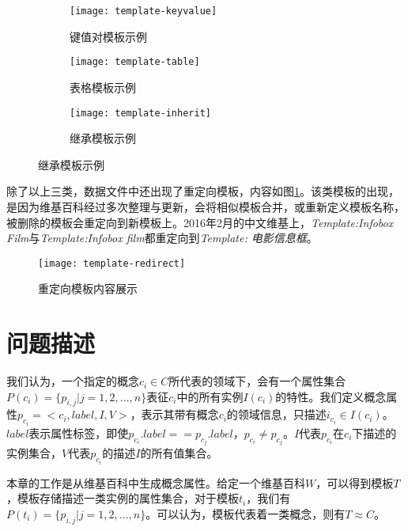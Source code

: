 \begin{figure}[h]
  \caption{模板类型举例}
  \label{fig:template-examples}

  \begin{subfigure}{4cm}
    \texttt{[image: template-keyvalue]}
    \caption{键值对模板示例}
  \end{subfigure}%
  \hspace{0.01cm}%

  \begin{subfigure}{4cm}
    \texttt{[image: template-table]}
    \caption{表格模板示例}
  \end{subfigure}%
  \hspace{0.01cm}%

  \begin{subfigure}{4cm}
    \texttt{[image: template-inherit]}
    \caption{继承模板示例}
  \end{subfigure}%
\end{figure}

除了以上三类，数据文件中还出现了{\heiti 重定向模板}，内容如图\ref{fig:template-redirect}。该类模板的出现，是因为维基百科经过多次整理与更新，会将相似模板合并，或重新定义模板名称，被删除的模板会重定向到新模板上。2016年2月的中文维基上，\textit{Template:Infobox Film}与\textit{Template:Infobox film}都重定向到\textit{Template: 电影信息框}。

\begin{figure}[H]
  \centering
  \texttt{[image: template-redirect]}
  \caption{重定向模板内容展示}
  \label{fig:template-redirect}
\end{figure}

\section{问题描述}

我们认为，一个指定的概念$c_i \in C$所代表的领域下，会有一个属性集合$P(c_i)=\{p_{i,j}|j=1,2,...,n\}$表征$c_i$中的所有实例$I(c_i)$的特性。我们定义概念属性$p_{c_i}= <c_i, label, I, V>$，表示其带有概念$c_i$的领域信息，只描述$i_{c_i} \in I(c_i)$。$label$表示属性标签，即使$p_{c_i}.label == p_{c_j}.label$，$p_{c_i} \neq p_{c_j}$。$I$代表$p_{c_i}$在$c_i$下描述的实例集合，$V$代表$p_{c_i}$的描述$I$的所有值集合。

本章的工作是从维基百科中生成概念属性。给定一个维基百科$W$，可以得到模板$T$，模板存储描述一类实例的属性集合，对于模板$t_i$，我们有$P(t_i)=\{p_{i,j}|j=1,2,...,n\}$。可以认为，模板代表着一类概念，则有$T \approx C$。

